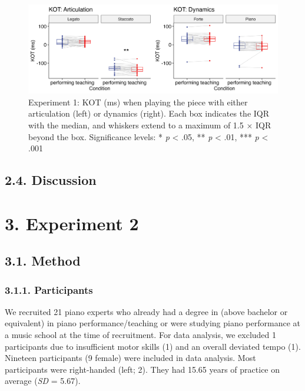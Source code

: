 \documentclass[
  english,
  man,floatsintext]{apa6}
\begin{document}
\begin{figure}
\includegraphics[width=1\linewidth]{manuscript_files/figure-latex/plot-kot-1-1} \caption{\label{fig:kot-1}Experiment 1: KOT (ms) when playing the piece with either articulation (left) or dynamics (right). Each box indicates the IQR with the median, and whiskers extend to a maximum of 1.5 × IQR beyond the box. Significance levels: * \textit{p} < .05, ** \textit{p} < .01, *** \textit{p} < .001}\label{fig:plot-kot-1}
\end{figure}

\hypertarget{discussion}{%
\subsection{2.4. Discussion}\label{discussion}}

\newpage

\hypertarget{experiment-2}{%
\section{3. Experiment 2}\label{experiment-2}}

\hypertarget{method-1}{%
\subsection{3.1. Method}\label{method-1}}

\hypertarget{participants-1}{%
\subsubsection{3.1.1. Participants}\label{participants-1}}

We recruited 21 piano experts who already had a degree in (above bachelor or equivalent) in piano performance/teaching or were studying piano performance at a music school at the time of recruitment. For data analysis, we excluded 1 participants due to insufficient motor skills (1) and an overall deviated tempo (1). Nineteen participants (9 female) were included in data analysis. Most participants were right-handed (left; 2). They had 15.65 years of practice on average (\emph{SD} = 5.67).
\end{document}
